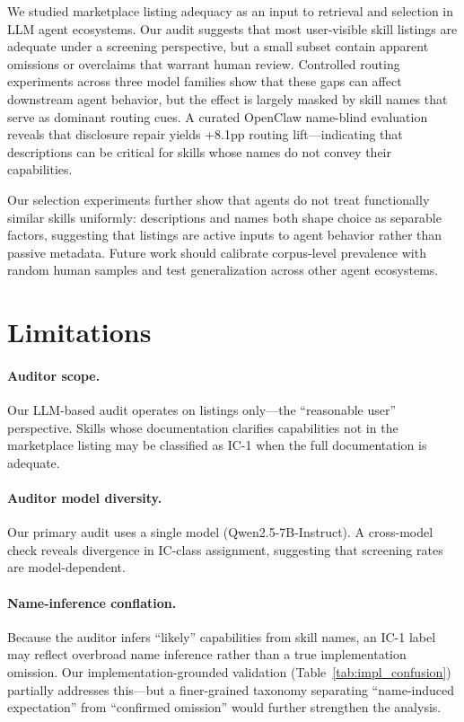 \documentclass[11pt]{article}
\begin{document}
We studied marketplace listing adequacy as an input
to retrieval and selection in LLM agent ecosystems.
Our audit suggests that most user-visible skill listings
are adequate under a screening perspective, but a small
subset contain apparent omissions or overclaims that
warrant human review.
Controlled routing experiments across three model families
show that these gaps can affect downstream agent behavior,
but the effect is largely masked by skill names that serve
as dominant routing cues.
A curated OpenClaw name-blind evaluation reveals that disclosure repair
yields +8.1pp routing lift---indicating that descriptions
can be critical for skills whose names do not convey their
capabilities.

Our selection experiments further show that agents
do not treat functionally similar skills uniformly:
descriptions and names both shape choice as separable
factors, suggesting that listings are active inputs
to agent behavior rather than passive metadata.
Future work should calibrate corpus-level prevalence
with random human samples and test generalization
across other agent ecosystems.

\label{pg:endcontent}%
\clearpage
\section*{Limitations}

\paragraph{Auditor scope.}
Our LLM-based audit operates on listings only---the
``reasonable user'' perspective.
Skills whose documentation clarifies capabilities
not in the marketplace listing may be classified as IC-1
when the full documentation is adequate.

\paragraph{Auditor model diversity.}
Our primary audit uses a single model (Qwen2.5-7B-Instruct).
A cross-model check reveals divergence in IC-class
assignment, suggesting that screening rates are
model-dependent.

\paragraph{Name-inference conflation.}
Because the auditor infers ``likely'' capabilities from
skill names, an IC-1 label may reflect overbroad name
inference rather than a true implementation omission.
Our implementation-grounded validation
(Table~\ref{tab:impl_confusion}) partially
addresses this---but a finer-grained taxonomy
separating ``name-induced expectation'' from
``confirmed omission'' would further strengthen
the analysis.
\end{document}
